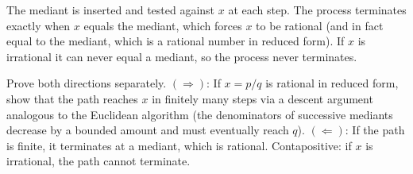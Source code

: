 \begin{remark}[Intuition]
The mediant is inserted and tested against $x$ at each step.  The process
terminates exactly when $x$ equals the mediant, which forces $x$ to be
rational (and in fact equal to the mediant, which is a rational number in
reduced form).  If $x$ is irrational it can never equal a mediant, so the
process never terminates.
\end{remark}

\begin{remark}
Prove both directions separately.
$(\Rightarrow)$: If $x = p/q$ is rational in reduced form, show that the
path reaches $x$ in finitely many steps via a descent argument analogous to
the Euclidean algorithm (the denominators of successive mediants decrease by
a bounded amount and must eventually reach $q$).
$(\Leftarrow)$: If the path is finite, it terminates at a mediant, which is
rational. Contapositive: if $x$ is irrational, the path cannot terminate.
\end{remark}